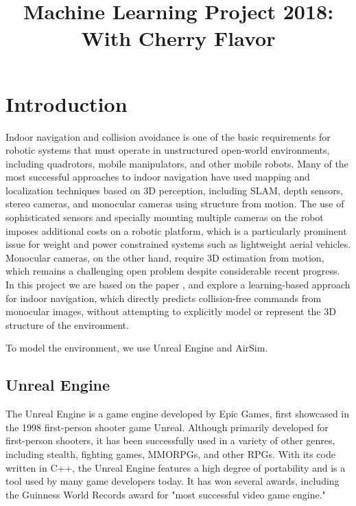 \documentclass{article}
\begin{document}
\title{Machine Learning Project 2018: With Cherry Flavor}
\maketitle

\small

\section{Introduction}

Indoor  navigation  and  collision  avoidance  is  one  of  the
basic  requirements  for  robotic  systems  that  must  operate  in
unstructured  open-world  environments,  including  quadrotors,
mobile  manipulators,  and  other  mobile  robots.  Many  of  the
most successful approaches to indoor navigation have used
mapping  and  localization  techniques  based  on  3D  
perception,  including  SLAM,  depth  sensors,  stereo  cameras,  
and  monocular  cameras  using  structure  from  motion. 
The use of sophisticated sensors and specially mounting multiple 
cameras on the robot imposes additional costs on
a  robotic  platform,  which  is  a  particularly  prominent  issue
for weight and power constrained systems such as lightweight
aerial vehicles. Monocular cameras, on the other hand, require
3D  estimation  from  motion,  which  remains  a  challenging
open  problem  despite  considerable  recent  progress.
In this project we are based on the paper \cite{cad2rl}, 
and explore a learning-based approach for indoor
navigation,  which  directly  predicts  collision-free
commands from monocular images, without attempting to 
explicitly  model  or  represent  the  3D  structure  
of  the  environment.

To model the environment, we use Unreal Engine and AirSim.

\subsection{Unreal Engine}

The Unreal Engine is a game engine developed by Epic Games, 
first showcased in the 1998 first-person shooter game Unreal. 
Although primarily developed for first-person shooters, it has 
been successfully used in a variety of other genres, including 
stealth, fighting games, MMORPGs, and other RPGs. With its code 
written in C++, the Unreal Engine features a high degree of portability 
and is a tool used by many game developers today. It has won several 
awards, including the Guinness World Records award 
for "most successful video game engine."
\end{document}
